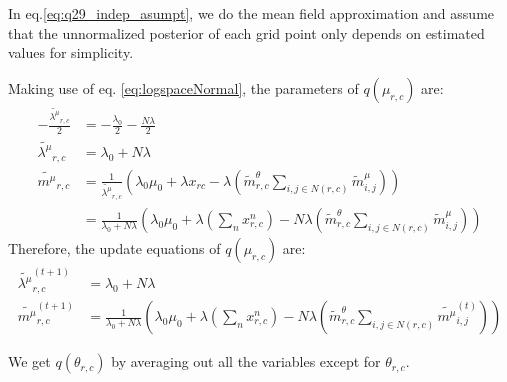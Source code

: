 \documentclass[12pt]{article}
\newenvironment{problem}[2][Problem]{\begin{trivlist}
\item[\hskip \labelsep {\bfseries #1}\hskip \labelsep {\bfseries #2.}]}{\end{trivlist}}
\begin{document}
\begin{problem}{2.9.25}
In eq.\eqref{eq:q29_indep_asumpt}, we do the mean field approximation and 
assume that the unnormalized posterior of each grid point only depends on
estimated values for simplicity. 

Making use of eq. \eqref{eq:logspaceNormal}, the parameters of $q(\mu_{r,c})$ are:
\begin{align*}
    -\frac{\tilde{\lambda^{\mu}}_{r,c}}{2} &= -\frac{\lambda_0}{2} -\frac{N\lambda}{2} \\
    \tilde{\lambda^{\mu}}_{r,c} &= \lambda_0 + N\lambda \\
    \tilde{m^{\mu}}_{r,c} &= 
    \frac{1}{\tilde{\lambda^{\mu}}_{r,c}}
    (\lambda_0\mu_0 + \lambda x_{rc} -\lambda(\tilde{m}^{\theta}_{r,c}\sum_{i,j \in N(r,c)}\tilde{m}^{\mu}_{i,j})) \\
    &= \frac{1}{\lambda_0 + N\lambda}
    (\lambda_0\mu_0 + \lambda (\sum_n x^n_{r,c}) - N\lambda(\tilde{m}^{\theta}_{r,c}\sum_{i,j \in N(r,c)}\tilde{m}^{\mu}_{i,j}))
\end{align*}
Therefore, the update equations of $q(\mu_{r,c})$ are:
\begin{align}
    \tilde{\lambda^{\mu}}_{r,c}^{(t+1)} &= \lambda_0 + N\lambda \\
    \tilde{m^{\mu}}_{r,c}^{(t+1)}  &= \frac{1}{\lambda_0 + N\lambda}
    (\lambda_0\mu_0 + \lambda (\sum_n x^n_{r,c}) - N\lambda(\tilde{m}^{\theta}_{r,c}\sum_{i,j \in N(r,c)}\tilde{m^{\mu}}_{i,j}^{(t)}))
\end{align}

We get $q(\theta_{r,c})$ by averaging out all the variables except for $\theta_{r,c}$.


\end{problem}
\end{document}
